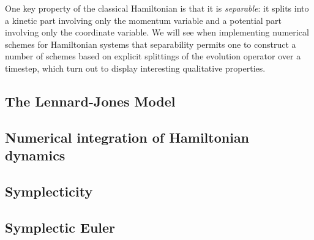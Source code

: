     One key property of the classical Hamiltonian is that it is \textit{separable}: it splits into a kinetic part involving only the momentum variable and a potential part involving only the coordinate variable. We will see when implementing numerical schemes for Hamiltonian systems that separability permits one to construct a number of schemes based on explicit splittings of the evolution operator over a timestep, which turn out to display interesting qualitative properties.
    
        \label{evolution operator exponential notation}

    \subsection{The Lennard-Jones Model}

    \subsection{Numerical integration of Hamiltonian dynamics}
    \subsection{Symplecticity}
    \subsection{Symplectic Euler}
